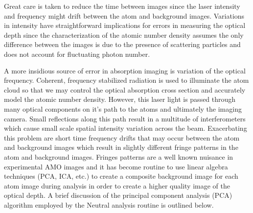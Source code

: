 Great care is taken to reduce the time between images since the laser intensity and frequency might drift between the atom and background images. 
Variations in intensity have straightforward implications for errors in measuring the optical depth since the characterization of the atomic number density assumes the only difference between the images is due to the presence of scattering particles and does not account for fluctuating photon number. 

A more insidious source of error in absorption imaging is variation of the optical frequency. 
Coherent, frequency stabilized radiation is used to illuminate the atom cloud so that we may control the optical absorption cross section and accurately model the atomic number density. 
However, this laser light is passed through many optical components on it's path to the atoms and ultimately the imaging camera. 
Small reflections along this path result in a multitude of interferometers which cause small scale spatial intensity variation across the beam. 
Exacerbating this problem are short time frequency drifts that may occur between the atom and background images which result in slightly different fringe patterns in the atom and background images. 
Fringes patterns are a well known nuisance in experimental AMO images and it has become routine to use linear algebra techniques (PCA, ICA, etc.) to create a composite background image for each atom image during analysis in order to create a higher quality image of the optical depth\cite{Segal2009}.
A brief discussion of the principal component analysis (PCA) algorithm employed by the Neutral analysis routine is outlined below.

